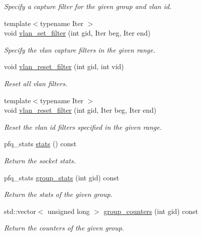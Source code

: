 \begin{DoxyCompactItemize}
\begin{DoxyCompactList}\small\item\em Specify a capture filter for the given group and vlan id. \end{DoxyCompactList}\item 
{\footnotesize template$<$typename Iter $>$ }\\void \hyperlink{classpfq_1_1socket_aee0fbc6a5f899d081c659dbaa4a4a235}{vlan\+\_\+set\+\_\+filter} (int gid, Iter beg, Iter end)
\begin{DoxyCompactList}\small\item\em Specify the vlan capture filters in the given range. \end{DoxyCompactList}\item 
void \hyperlink{classpfq_1_1socket_a296d1eddfb061c1a658067006ddb9f37}{vlan\+\_\+reset\+\_\+filter} (int gid, int vid)
\begin{DoxyCompactList}\small\item\em Reset all vlan filters. \end{DoxyCompactList}\item 
{\footnotesize template$<$typename Iter $>$ }\\void \hyperlink{classpfq_1_1socket_a18efa89248a6d6bfb29d575744d21608}{vlan\+\_\+reset\+\_\+filter} (int gid, Iter beg, Iter end)
\begin{DoxyCompactList}\small\item\em Reset the vlan id filters specified in the given range. \end{DoxyCompactList}\item 
pfq\+\_\+stats \hyperlink{classpfq_1_1socket_a0a0a637d733613bf86d6d85168d2e37f}{stats} () const 
\begin{DoxyCompactList}\small\item\em Return the socket stats. \end{DoxyCompactList}\item 
pfq\+\_\+stats \hyperlink{classpfq_1_1socket_a39397866032a4654c4dc000185c61e01}{group\+\_\+stats} (int gid) const 
\begin{DoxyCompactList}\small\item\em Return the stats of the given group. \end{DoxyCompactList}\item 
std\+::vector$<$ unsigned long $>$ \hyperlink{classpfq_1_1socket_a5bb4734939ffeb151e199182ec30c4de}{group\+\_\+counters} (int gid) const 
\begin{DoxyCompactList}\small\item\em Return the counters of the given group. \end{DoxyCompactList}\item 

\end{DoxyCompactItemize}

